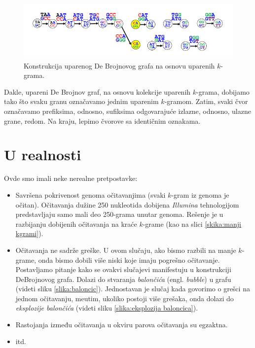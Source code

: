 \begin{figure}[h]
	\centering
	\includegraphics[width=1\textwidth]{poglavlja/3/slike/upareno_lepljenje2.png}
	\caption{Konstrukcija uparenog De Brojnovog grafa na osnovu uparenih $k$-grama.}
	\label{slika:uparenoLepljenje2}
\end{figure} 

Dakle, upareni De Brojnov graf, na osnovu kolekcije uparenih $k$-grama, dobijamo tako što svaku granu označavamo jednim uparenim $k$-gramom. Zatim, svaki čvor označavamo prefiksima, odnosno, sufiksima odgovaraju\'ce izlazne, odnosno, ulazne grane, redom. Na kraju, lepimo čvorove sa identičnim oznakama.

\section{U realnosti}

Ovde smo imali neke nerealne pretpostavke:

\begin{itemize}
	\item Savršena pokrivenost genoma očitavanjima (svaki $k$-gram iz genoma je očitan). Očitavanja dužine 250 nukleotida dobijena \emph{Illumina} tehnologijom predstavljaju samo mali deo 250-grama unutar genoma. Rešenje je u razbijanju dobijenih očitavanja na kraće $k$-grame (kao na slici \ref{skika:manji kgrami}).
	
	\item Očitavanja ne sadrže greške. U ovom slu\v caju, ako bismo razbili na manje $k$-grame, onda bismo dobili vi\v se niski koje imaju pogre\v sno o\v citavanje. Postavljamo pitanje kako se ovakvi slu\v cajevi manifestuju u konstrukciji DeBrojnovog grafa. Dolazi do stvaranja \emph{balon\v ci\'ca} (engl. \emph{bubble}) u grafu (videti sliku \ref{slika:baloncic}). Jednostavan je slu\v caj kada govorimo o gre\v sci na jednom o\v citavanju, me\dj utim, ukoliko postoji vi\v se gre\v saka, onda dolazi do \emph{eksplozije balon\v ci\'ca} (videti sliku \ref{slika:eksplozija baloncica}).
	
	\item Rastojanja između očitavanja u okviru parova očitavanja su egzaktna.
	
	\item itd.
\end{itemize}


